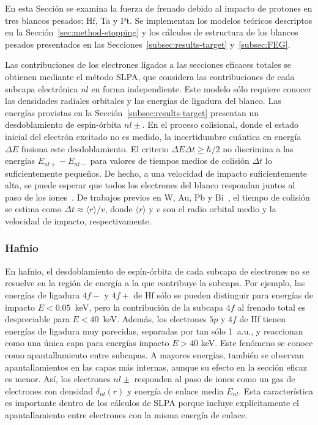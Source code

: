 En esta Sección se examina la fuerza de frenado debido al impacto de 
protones en tres blancos pesados: Hf, Ta y Pt. Se implementan los 
modelos teóricos descriptos en la Sección~\ref{sec:method-stopping} y los
cálculos de estructura de los blancos pesados presentados en las 
Secciones~\ref{subsec:results-target} y~\ref{subsec:FEG}.

Las contribuciones de los electrones ligados a las secciones eficaces 
totales se obtienen mediante el método SLPA, que considera las 
contribuciones de cada subcapa electrónica $nl$ en forma independiente.
Este modelo sólo requiere conocer las densidades radiales orbitales y
las energías de ligadura del blanco. Las energías provistas en la 
Sección~\ref{subsec:results-target} presentan un desdoblamiento de 
espín-órbita $nl\pm$. En el proceso colisional, donde el 
estado inicial del electrón excitado no es medido, la incertidumbre 
cuántica en energía $\Delta E$ fusiona este desdoblamiento. El criterio 
$\Delta E\Delta t\geq\hbar/2$ no discrimina a las energías 
$E_{nl+}-E_{nl-}$ para valores de tiempos medios de colisión $\Delta t$ 
lo suficientemente pequeños. De hecho, a una velocidad de impacto 
suficientemente alta, se puede esperar que todos los electrones del 
blanco respondan juntos al paso de los iones~\cite{Lindhard:53,Chu:72}. 
De trabajos previos en W, Au, Pb y Bi~\cite{Montanari:09}, el 
tiempo de colisión se estima como $\Delta t\approx\langle r\rangle/v$, 
donde $\langle r\rangle$ y $v$ son el radio orbital medio y la velocidad 
de impacto, respectivamente.

\subsubsection{Hafnio}

En hafnio, el desdoblamiento de espín-órbita de cada subcapa de 
electrones no se resuelve en la región de energía a la que contribuye 
la subcapa. Por ejemplo, las energías de ligadura $4f-$ y $4f+$ de Hf 
sólo se pueden distinguir para energías de impacto $E<0.05$~keV, pero 
la contribución de la subcapa $4f$ al frenado total es despreciable para 
$E<40$~keV. Además, los electrones $5p$ y $4f$ de Hf tienen energías de 
ligadura muy parecidas, separadas por tan sólo 1~a.u., y reaccionan como 
una única capa para energías impacto $E>40$ keV. Este fenómeno se conoce 
como apantallamiento entre subcapas. A mayores energías, también se 
observan apantallamientos en las capas más internas, aunque su efecto en 
la sección eficaz es menor. Así, los electrones $nl\pm$ responden al 
paso de iones como un gas de electrones con densidad $\delta_{nl}(r)$ y 
energía de enlace media $E_{nl}$. Esta característica es importante 
dentro de los cálculos de SLPA porque incluye explícitamente el 
apantallamiento entre electrones con la misma energía de enlace. 

